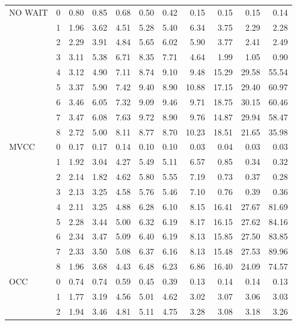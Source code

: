\begin{tabular}{llrrrrrrrrr}
NO WAIT & 0 &  0.80 &  0.85 &  0.68 &  0.50 &  0.42 &  0.15 &  0.15 &  0.15 &   0.14 \\
       & 1 &  1.96 &  3.62 &  4.51 &  5.28 &  5.40 &  6.34 &  3.75 &  2.29 &   2.28 \\
       & 2 &  2.29 &  3.91 &  4.84 &  5.65 &  6.02 &  5.90 &  3.77 &  2.41 &   2.49 \\
       & 3 &  3.11 &  5.38 &  6.71 &  8.35 &  7.71 &  4.64 &  1.99 &  1.05 &   0.90 \\
       & 4 &  3.12 &  4.90 &  7.11 &  8.74 &  9.10 &  9.48 & 15.29 & 29.58 &  55.54 \\
       & 5 &  3.37 &  5.90 &  7.42 &  9.40 &  8.90 & 10.88 & 17.15 & 29.40 &  60.97 \\
       & 6 &  3.46 &  6.05 &  7.32 &  9.09 &  9.46 &  9.71 & 18.75 & 30.15 &  60.46 \\
       & 7 &  3.47 &  6.08 &  7.63 &  9.72 &  8.90 &  9.76 & 14.87 & 29.94 &  58.47 \\
       & 8 &  2.72 &  5.00 &  8.11 &  8.77 &  8.70 & 10.23 & 18.51 & 21.65 &  35.98 \\
MVCC & 0 &  0.17 &  0.17 &  0.14 &  0.10 &  0.10 &  0.03 &  0.04 &  0.03 &   0.03 \\
       & 1 &  1.92 &  3.04 &  4.27 &  5.49 &  5.11 &  6.57 &  0.85 &  0.34 &   0.32 \\
       & 2 &  2.14 &  1.82 &  4.62 &  5.80 &  5.55 &  7.19 &  0.73 &  0.37 &   0.28 \\
       & 3 &  2.13 &  3.25 &  4.58 &  5.76 &  5.46 &  7.10 &  0.76 &  0.39 &   0.36 \\
       & 4 &  2.11 &  3.25 &  4.88 &  6.28 &  6.10 &  8.15 & 16.41 & 27.67 &  81.69 \\
       & 5 &  2.28 &  3.44 &  5.00 &  6.32 &  6.19 &  8.17 & 16.15 & 27.62 &  84.16 \\
       & 6 &  2.34 &  3.47 &  5.09 &  6.40 &  6.19 &  8.13 & 15.85 & 27.50 &  83.85 \\
       & 7 &  2.33 &  3.50 &  5.08 &  6.37 &  6.16 &  8.13 & 15.48 & 27.53 &  89.96 \\
       & 8 &  1.96 &  3.68 &  4.43 &  6.48 &  6.23 &  6.86 & 16.40 & 24.09 &  74.57 \\
OCC & 0 &  0.74 &  0.74 &  0.59 &  0.45 &  0.39 &  0.13 &  0.14 &  0.14 &   0.13 \\
       & 1 &  1.77 &  3.19 &  4.56 &  5.01 &  4.62 &  3.02 &  3.07 &  3.06 &   3.03 \\
       & 2 &  1.94 &  3.46 &  4.81 &  5.11 &  4.75 &  3.28 &  3.08 &  3.18 &   3.26 \\

\end{tabular}
